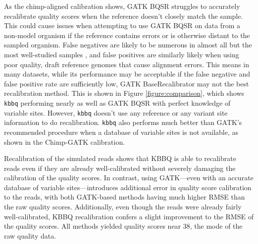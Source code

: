 As the chimp-aligned calibration shows, GATK BQSR struggles to accurately recalibrate quality scores when the reference doesn't closely match the sample. This could cause issues when attempting to use GATK BQSR on data from a non-model organism if the reference contains errors or is otherwise distant to the sampled organism. False negatives are likely to be numerous in almost all but the most well-studied samples \parencite{bobo_false_2016}, and false positives are similarly likely when using poor quality, draft reference genomes that cause alignment errors. This means in many datasets, while its performance may be acceptable if the false negative and false positive rate are sufficiently low, GATK BaseRecalibrator may not the best recalibration method. This is shown in Figure \ref{figure:comparison}, which shows \texttt{kbbq} performing nearly as well as GATK BQSR with perfect knowledge of variable sites. However, \texttt{kbbq} doesn't use any reference or any variant site information to do recalibration. \texttt{kbbq} also performs much better than GATK's recommended procedure when a database of variable sites is not available, as shown in the Chimp-GATK calibration.

Recalibration of the simulated reads shows that KBBQ is able to recalibrate reads even if they are already well-calibrated without severely damaging the calibration of the quality scores. In contrast, using GATK---even with an accurate database of variable sites---introduces additional error in quality score calibration to the reads, with both GATK-based methods having much higher RMSE than the raw quality scores. Additionally, even though the reads were already fairly well-calibrated, KBBQ recalibration confers a slight improvement to the RMSE of the quality scores. All methods yielded quality scores near 38, the mode of the raw quality data.

